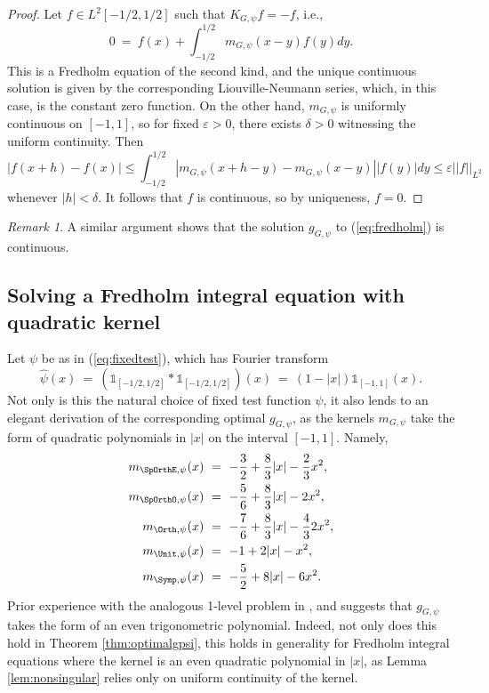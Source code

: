 \documentclass[12pt, reqno]{amsart}
\numberwithin{equation}{section}
\theoremstyle{definition}
\theoremstyle{remark}
\newtheorem*{remark}{Remark}
\renewcommand{\epsilon}{\varepsilon}
\begin{document}
\begin{proof}
	Let $f \in L^2 [-1/2, 1/2]$ such that $K_{G, \psi} f = -f$, i.e.,
		\[ 0 \ = \  f(x) + \int_{-1/2}^{1/2} m_{G, \psi} (x - y) f(y) dy. \]
	This is a Fredholm equation of the second kind, and the unique continuous solution is given by the corresponding Liouville-Neumann series, which, in this case, is the constant zero function. On the other hand, $m_{G, \psi}$ is uniformly continuous on $[-1, 1]$, so for fixed $\epsilon > 0$, there exists $\delta > 0$ witnessing the uniform continuity. Then
		\[ |f(x + h) - f(x)| \leq \int_{-1/2}^{1/2} |m_{G, \psi} (x + h - y) - m_{G, \psi}(x - y)| |f(y)| dy \leq \epsilon ||f||_{L^2} \]
	whenever $|h| < \delta$. It follows that $f$ is continuous, so by uniqueness, $f = 0$. 	
\end{proof}

\begin{remark}
	A similar argument shows that the solution $g_{G, \psi}$ to (\ref{eq:fredholm}) is continuous.
\end{remark}


\subsection{Solving a Fredholm integral equation with quadratic kernel} \label{sec:quadker}

Let $\psi$ be as in (\ref{eq:fixedtest}), which has Fourier transform
	\begin{equation}	
		\widehat \psi (x) \ = \  (\mathbb 1_{[-1/2, 1/2]} * \mathbb 1_{[-1/2, 1/2]})(x) \ = \  (1 - |x|) \mathbb 1_{[-1, 1]} (x).
	\end{equation}	
Not only is this the natural choice of fixed test function $\psi$, it also lends to an elegant derivation of the corresponding optimal $g_{G, \psi}$, as the kernels $m_{G, \psi}$ take the form of quadratic polynomials in $|x|$ on the interval $[-1, 1]$. Namely,
\begin{align}
	m_{\SpOrthE, \psi} (x)
		&\ = \  -\frac32 + \frac83 |x| - \frac23 x^2, \\
	m_{\SpOrthO, \psi} (x)
		&\ = \  -\frac{5}{6} + \frac83 |x| - 2 x^2, \\
	m_{\Orth, \psi} (x)
		&\ = \  -\frac76 + \frac83 |x| -\frac43 2x^2, \\
	m_{\Unit, \psi} (x)
		&\ = \  -1 + 2 |x| - x^2,\\
	m_{\Symp, \psi} (x)
		&\ = \  - \frac52 + 8|x| - 6 x^2.
\end{align}
Prior experience with the analogous 1-level problem in \cite{ILS}, \cite{FreemanThesis} and \cite{FreemanMiller} suggests that $g_{G, \psi}$ takes the form of an even trigonometric polynomial. Indeed, not only does this hold in Theorem \ref{thm:optimalgpsi}, this holds in generality for Fredholm integral equations where the kernel is an even quadratic polynomial in $|x|$, as Lemma \ref{lem:nonsingular} relies only on uniform continuity of the kernel.
\end{document}

